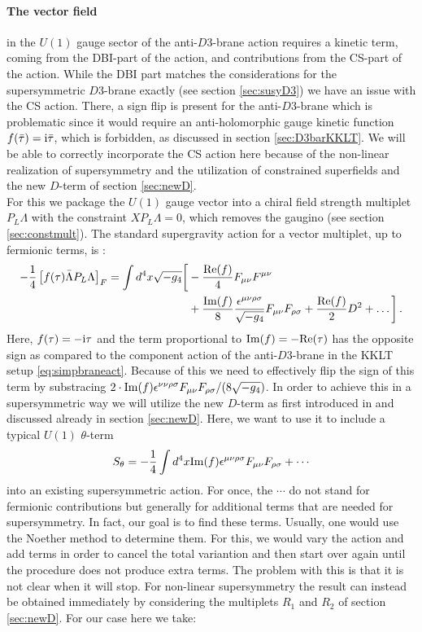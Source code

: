 \documentclass[12pt]{report}
\newcommand{\be}{\begin{equation}}
\newcommand{\ee}{\end{equation}}
\newcommand{\bea}{\begin{equation}\begin{aligned}}
\newcommand{\eea}{\end{aligned}\end{equation}}
\def\rmi{{\rm i}}
\def\rmre{{\rm Re}}
\def\rmim{{\rm Im}}
\begin{document}
\paragraph{The vector field} in the $U(1)$ gauge sector of the anti-$D3$-brane action requires a kinetic term, coming from the DBI-part of the action, and contributions from the CS-part of the action. While the DBI part matches the considerations for the supersymmetric $D3$-brane exactly (see section \ref{sec:susyD3}) we have an issue with the CS action. There, a sign flip is present for the anti-$D3$-brane which is problematic since it would require an anti-holomorphic gauge kinetic function $f(\bar{\tau}) = \rmi \bar{\tau}$, which is forbidden, as discussed in section \ref{sec:D3barKKLT}. We will be able to correctly incorporate the CS action here because of the non-linear realization of supersymmetry and the utilization of constrained superfields and the new $D$-term of section \ref{sec:newD}.\\
For this we package the $U(1)$ gauge vector into a chiral field strength multiplet $P_L\Lambda$ with the constraint $X P_L\Lambda = 0$, which removes the gaugino (see section \ref{sec:constmult}). The standard supergravity action for a vector multiplet, up to fermionic terms, is \cite{Freedman:2012zz}:
\bea
-\frac{1}{4} \left[f(\tau)\bar{\Lambda}P_L\Lambda\right]_F = \int d^4x \sqrt{-g_4}\bigg[&-\frac{\rmre(f)}{4} F_{\mu\nu}F^{\mu\nu}\\
&+\frac{\rmim(f)}{8}\frac{\epsilon^{\mu\nu\rho\sigma}}{\sqrt{-g_4}}F_{\mu\nu}F_{\rho\sigma}+\frac{\rmre(f)}{2}D^2 + \dots \bigg]\,.
\eea
Here, $f(\tau) = -\rmi \tau$ and the term proportional to $\rmim(f)=-\rmre(\tau)$ has the opposite sign as compared to the component action of the anti-$D3$-brane in the KKLT setup \eqref{eq:simpbraneact}. Because of this we need to effectively flip the sign of this term by substracing $2 \cdot \rmim(f) \epsilon^{\nu\nu\rho\sigma}F_{\mu\nu}F_{\rho\sigma}/(8 \sqrt{-g_4})$. In order to achieve this in a supersymmetric way we will utilize the new $D$-term as first introduced in \cite{Cribiori:2017laj} and discussed already in section \ref{sec:newD}. Here, we want to use it to include a typical $U(1)$ $\theta$-term
\be 
S_{\theta} = -\frac{1}{4} \int d^4x \rmim(f)\epsilon^{\mu\nu\rho\sigma}F_{\mu\nu}F_{\rho\sigma} + \cdots
\label{eq:Stheta}
\ee
into an existing supersymmetric action. For once, the $\cdots$ do not stand for fermionic contributions but generally for additional terms that are needed for supersymmetry. In fact, our goal is to find these terms. Usually, one would use the Noether method to determine them. For this, we would vary the action and add terms in order to cancel the total variantion and then start over again until the procedure does not produce extra terms. The problem with this is that it is not clear when it will stop. For non-linear supersymmetry the result can instead be obtained immediately by considering the multiplets $R_1$ and $R_2$ of section \ref{sec:newD}. For our case here we take:
\end{document}
